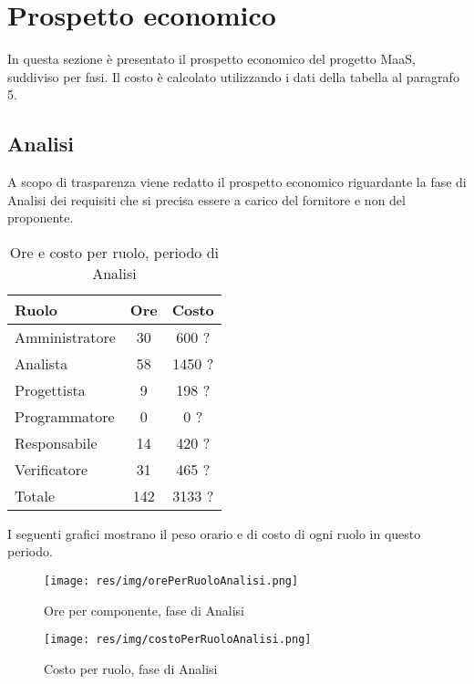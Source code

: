 \section{Prospetto economico}
In questa sezione è presentato il prospetto economico del progetto MaaS, suddiviso per fasi. Il costo è calcolato utilizzando i dati
della tabella al paragrafo 5.

\subsection{Analisi}
A scopo di trasparenza viene redatto il prospetto economico riguardante la fase di Analisi dei requisiti che si precisa essere a carico del fornitore e non del proponente.

\begin{table}[H]
	\centering
	\begin{tabular}{ l c c }
		\textbf{Ruolo} & \textbf{Ore} & \textbf{Costo} \\
		\hline
		Amministratore & 30 & 600 ? \\
		Analista & 58 & 1450 ? \\
		Progettista & 9 & 198 ? \\
		Programmatore & 0 & 0 ? \\
		Responsabile & 14 & 420 ? \\
		Verificatore & 31 & 465 ? \\
		\hline
		Totale & 142 & 3133 ? \\
		\hline
	\end{tabular}
	\caption{Ore e costo per ruolo, periodo di Analisi}
\end{table}

I seguenti grafici mostrano il peso orario e di costo di ogni ruolo in questo periodo.

\begin{figure}[H]
  \begin{center}
    \texttt{[image: res/img/orePerRuoloAnalisi.png]}
  \caption{Ore per componente, fase di Analisi}
  \end{center} 
\end{figure}  

\begin{figure}[H]
  \begin{center}
    \texttt{[image: res/img/costoPerRuoloAnalisi.png]}
  \caption{Costo per ruolo, fase di Analisi}
  \end{center} 
\end{figure}  


